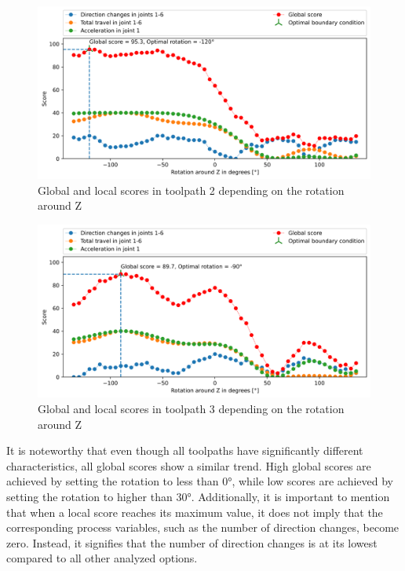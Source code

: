 \begin{figure}[H]
\centerline{\includegraphics[width=1\textwidth]{figures/best_c_2_combi.png}}
\caption{Global and local scores in toolpath 2 depending on the rotation around Z}
\label{TP2_combi}
\end{figure}
\begin{figure}[H]
\centerline{\includegraphics[width=1\textwidth]{figures/best_c_3_combi.png}}
\caption{Global and local scores in toolpath 3 depending on the rotation around Z}
\label{TP3_combi}
\end{figure}

It is noteworthy that even though all toolpaths have significantly different characteristics, all global scores show a similar trend. High global scores are achieved by setting the rotation to less than 0°, while low scores are achieved by setting the rotation to higher than 30°. Additionally, it is important to mention that when a local score reaches its maximum value, it does not imply that the corresponding process variables, such as the number of direction changes, become zero. Instead, it signifies that the number of direction changes is at its lowest compared to all other analyzed options.
\newpage
